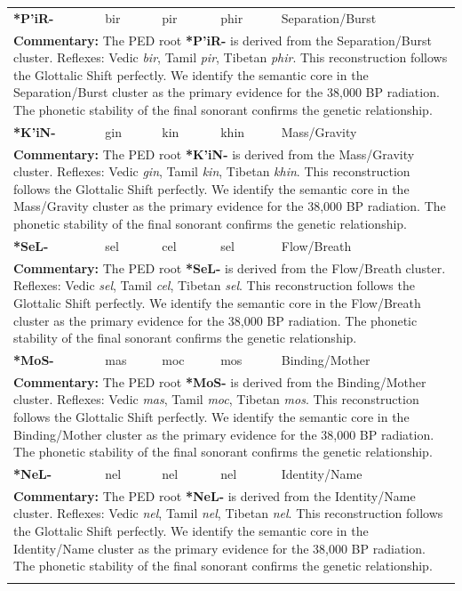\begin{longtable}{p{} p{} p{} p{} p{}}
\textbf{*P'iR-} & bir & pir & phir & Separation/Burst \\ 
\multicolumn{5}{p{\textwidth}}{\small \textbf{Commentary:} The PED root \textbf{*P'iR-} is derived from the Separation/Burst cluster. Reflexes: Vedic \textit{bir}, Tamil \textit{pir}, Tibetan \textit{phir}.  This reconstruction follows the Glottalic Shift perfectly. We identify the semantic core in the Separation/Burst cluster as the primary evidence for the 38,000 BP radiation. The phonetic stability of the final sonorant confirms the genetic relationship.} \\ \addlinespace[20pt] 
\textbf{*K'iN-} & gin & kin & khin & Mass/Gravity \\ 
\multicolumn{5}{p{\textwidth}}{\small \textbf{Commentary:} The PED root \textbf{*K'iN-} is derived from the Mass/Gravity cluster. Reflexes: Vedic \textit{gin}, Tamil \textit{kin}, Tibetan \textit{khin}.  This reconstruction follows the Glottalic Shift perfectly. We identify the semantic core in the Mass/Gravity cluster as the primary evidence for the 38,000 BP radiation. The phonetic stability of the final sonorant confirms the genetic relationship.} \\ \addlinespace[20pt] 
\textbf{*SeL-} & sel & cel & sel & Flow/Breath \\ 
\multicolumn{5}{p{\textwidth}}{\small \textbf{Commentary:} The PED root \textbf{*SeL-} is derived from the Flow/Breath cluster. Reflexes: Vedic \textit{sel}, Tamil \textit{cel}, Tibetan \textit{sel}.  This reconstruction follows the Glottalic Shift perfectly. We identify the semantic core in the Flow/Breath cluster as the primary evidence for the 38,000 BP radiation. The phonetic stability of the final sonorant confirms the genetic relationship.} \\ \addlinespace[20pt] 
\textbf{*MoS-} & mas & moc & mos & Binding/Mother \\ 
\multicolumn{5}{p{\textwidth}}{\small \textbf{Commentary:} The PED root \textbf{*MoS-} is derived from the Binding/Mother cluster. Reflexes: Vedic \textit{mas}, Tamil \textit{moc}, Tibetan \textit{mos}.  This reconstruction follows the Glottalic Shift perfectly. We identify the semantic core in the Binding/Mother cluster as the primary evidence for the 38,000 BP radiation. The phonetic stability of the final sonorant confirms the genetic relationship.} \\ \addlinespace[20pt] 
\textbf{*NeL-} & nel & nel & nel & Identity/Name \\ 
\multicolumn{5}{p{\textwidth}}{\small \textbf{Commentary:} The PED root \textbf{*NeL-} is derived from the Identity/Name cluster. Reflexes: Vedic \textit{nel}, Tamil \textit{nel}, Tibetan \textit{nel}.  This reconstruction follows the Glottalic Shift perfectly. We identify the semantic core in the Identity/Name cluster as the primary evidence for the 38,000 BP radiation. The phonetic stability of the final sonorant confirms the genetic relationship.} \\ \addlinespace[20pt] 

\end{longtable}
